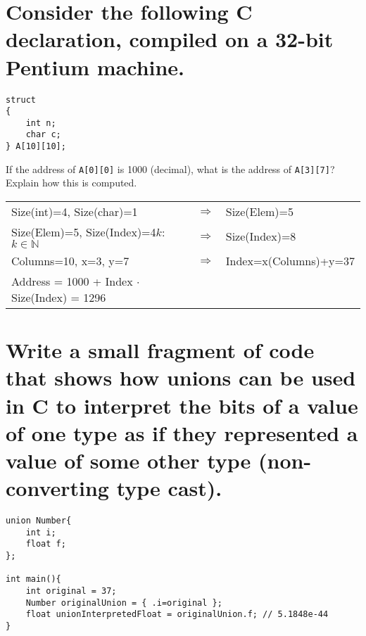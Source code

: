 \documentclass[letterpaper]{article}
\begin{document}
\section{Consider the following C declaration, compiled on a 32-bit Pentium machine.}
\begin{adjustwidth}{2.35em}{0pt}
\begin{lstlisting}
struct
{
	int n;
	char c;
} A[10][10];
\end{lstlisting}
If the address of \texttt{A[0][0]} is 1000 (decimal), what is the address of \texttt{A[3][7]}? Explain how this is computed.
\end{adjustwidth}
\begin{adjustwidth}{1.8em}{0pt}
\begin{tabular}{l c l}
Size(int)=4, Size(char)=1 & $\Rightarrow$ & Size(Elem)=5 \\
Size(Elem)=5, Size(Index)=4$k$: $k\in\mathbb{N}$  & $\Rightarrow$ & Size(Index)=8 \\
Columns=10, x=3, y=7  & $\Rightarrow$ & Index=x(Columns)+y=37 \\
Address = 1000 + Index $\cdot$ Size(Index) = 1296
\end{tabular}
\end{adjustwidth}

\section{Write a small fragment of code that shows how unions can be used in C to interpret the bits of a value of one type as if they represented a value of some other type (non-converting type cast).}
\begin{adjustwidth}{2.35em}{0pt}
\begin{lstlisting}
union Number{
	int i;
	float f;
};

int main(){
	int original = 37;
	Number originalUnion = { .i=original };
	float unionInterpretedFloat = originalUnion.f; // 5.1848e-44
}
\end{lstlisting}
\end{adjustwidth}
\end{document}
